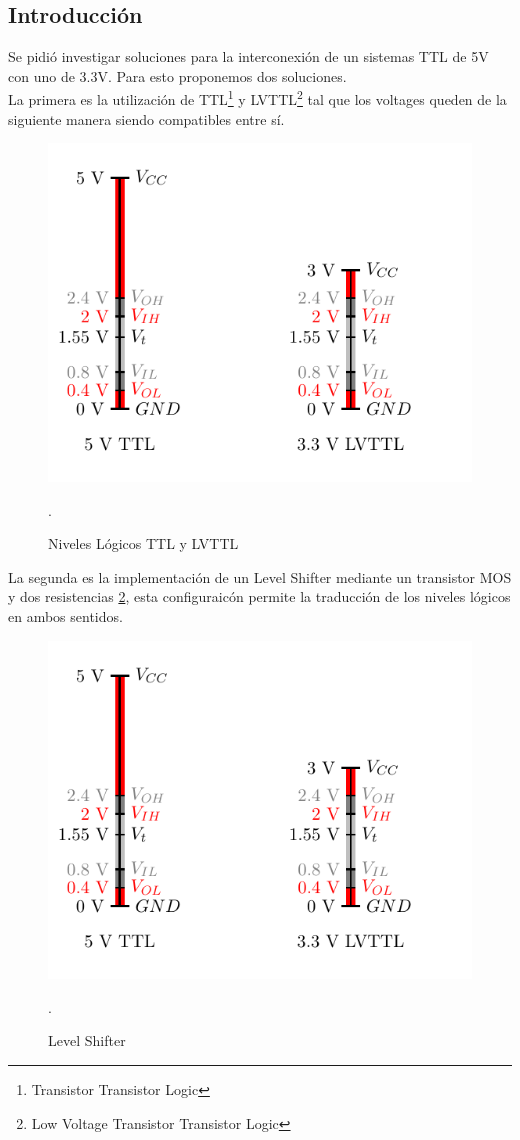 



\subsection{Introducción}
Se pidió investigar soluciones para la interconexión de un sistemas TTL de 5V con uno de 3.3V. Para esto proponemos dos soluciones.\\
La primera es la utilización de TTL\footnote{Transistor Transistor Logic} y LVTTL\footnote{Low Voltage Transistor Transistor Logic} tal que los voltages queden de la siguiente manera siendo compatibles entre sí.\\
\begin{figure}[H]
  \centering
  \includegraphics[width=.6\textwidth, page = 1]{ImagenesEjercicio4/Draw.pdf}
  \caption{Niveles Lógicos TTL y LVTTL}.
  \label{fig:ttlLvl}
\end{figure}
La segunda es la implementación de un Level Shifter mediante un transistor MOS y dos resistencias \ref{fig:LVSH}, esta configuraicón permite la traducción de los niveles lógicos en ambos sentidos.
\begin{figure}[H]
  \centering
  \includegraphics[width=.6\textwidth, page = 2]{ImagenesEjercicio4/Draw.pdf}
  \caption{Level Shifter}.
  \label{fig:LVSH}
\end{figure}

